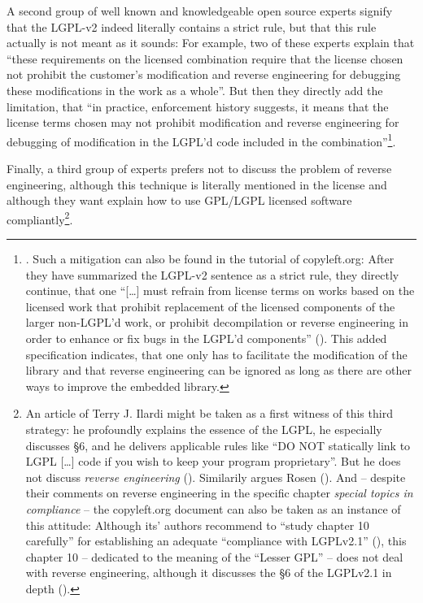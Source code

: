 A second group of well known and knowledgeable open source experts signify that
the LGPL-v2 indeed literally contains a strict rule, but that this rule actually
is not meant as it sounds: For example, two of these experts explain that
\enquote{these requirements on the licensed combination require that the license
chosen not prohibit the customer’s modification and reverse engineering for
debugging these modifications in the work as a whole}. But then they directly
add the limitation, that \enquote{in practice, enforcement history suggests, it
means that the license terms chosen may not prohibit modification and reverse
engineering for debugging of modification in the LGPL’d code included in the
combination}\footnote{\cite[cf.][\nopage wp., chapter LGPLv2.1, section
6]{MogCho2014a}. Such a mitigation can also be found in the tutorial of
copyleft.org: After they have summarized the LGPL-v2 sentence as a strict rule,
they directly continue, that one \enquote{[\ldots] must refrain from license
terms on works based on the licensed work that prohibit replacement of the
licensed components of the larger non-LGPL'd work, or prohibit decompilation or
reverse engineering in order to enhance or fix bugs in the LGPL'd components}
(\cite[cf.][86]{KuhSebGin2014a}). This added specification indicates, that one
only has to facilitate the modification of the library and that reverse
engineering can be ignored as long as there are other ways to improve the
embedded library.}.

Finally, a third group of experts prefers not to discuss the problem of reverse
engineering, although this technique is literally mentioned in the license and
although they want explain how to use GPL/LGPL licensed software
compliantly\footnote{An article of Terry J. Ilardi might be taken as a first
witness of this third strategy: he profoundly explains the essence of the LGPL,
he especially discusses §6, and he delivers applicable rules like \enquote{DO
NOT statically link to LGPL [\ldots] code if you wish to keep your program
proprietary}. But he does not discuss \emph{reverse engineering}
(\cite[cf.][5f]{Ilardi2010a}). Similarily argues Rosen
(\cite[cf.][121ff]{Rosen2005a}). And -- despite their comments on reverse
engineering in the specific chapter \emph{special topics in compliance} -- the
copyleft.org document can also be taken as an instance of this attitude:
Although its' authors recommend to \enquote{study chapter 10 carefully} for
establishing an adequate \enquote{compliance with LGPLv2.1}
(\cite[cf.][86]{KuhSebGin2014a}), this chapter 10 -- dedicated to the meaning of
the \enquote{Lesser GPL} -- does not deal with reverse engineering, although it
discusses the §6 of the LGPLv2.1 in depth (\cite[cf.][56ff, esp.
60f]{KuhSebGin2014a}).}.


